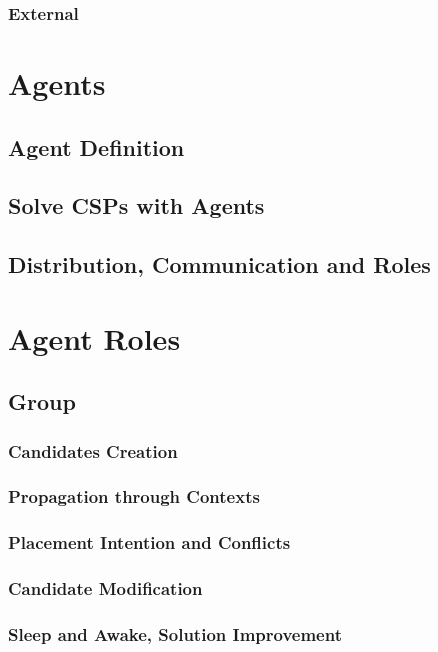 \documentclass{beamer}
\begin{document}
\subsubsection{External}

\section{Agents}
\subsection{Agent Definition}
\subsection{Solve CSPs with Agents}
\subsection{Distribution, Communication and Roles}

\section{Agent Roles}

\subsection{Group}
\subsubsection{Candidates Creation}
\subsubsection{Propagation through Contexts}
\subsubsection{Placement Intention and Conflicts}
\subsubsection{Candidate Modification}
\subsubsection{Sleep and Awake, Solution Improvement}
\end{document}

